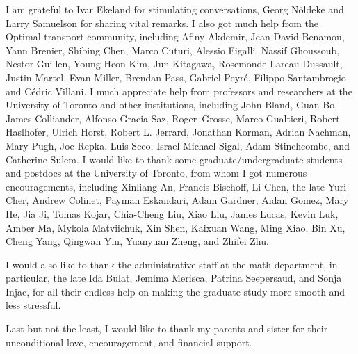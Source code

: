 \documentclass{ut-thesis}[10pt]
\theoremstyle{plain}
\theoremstyle{definition}
\theoremstyle{remark}
\numberwithin{equation}{section}
\begin{document}
\begin{preliminary}
\begin{acknowledgements}
I am grateful to Ivar Ekeland for stimulating conversations, Georg N\" oldeke and Larry Samuelson for sharing vital remarks.
I also got much help from the Optimal transport community, including  Afiny Akdemir, Jean-David Benamou, Yann Brenier, Shibing Chen, Marco Cuturi, Alessio Figalli, Nassif Ghoussoub, Nestor Guillen, Young-Heon Kim, Jun Kitagawa, Rosemonde Lareau-Dussault, Justin Martel, Evan Miller, Brendan Pass, Gabriel Peyré, Filippo Santambrogio and Cédric Villani. I much appreciate help from professors and researchers at the University of Toronto and other institutions, including John Bland, Guan Bo, James Colliander, Alfonso Gracia-Saz, Roger~Grosse, Marco Gualtieri, Robert Haslhofer, Ulrich Horst, Robert L. Jerrard, Jonathan Korman, Adrian Nachman, Mary Pugh, Joe Repka, Luis Seco,  Israel Michael Sigal, Adam Stinchcombe, and Catherine Sulem.
I would like to thank some graduate/undergraduate students and postdocs at the University of Toronto, from whom I got numerous encouragements, including Xinliang An,  Francis Bischoff, Li Chen, the late Yuri Cher,  Andrew Colinet, Payman Eskandari, Adam Gardner, Aidan Gomez, Mary He,  Jia Ji, Tomas Kojar, Chia-Cheng Liu, Xiao Liu,  James Lucas, Kevin Luk,  Amber Ma,  Mykola Matviichuk,  Xin Shen,  Kaixuan Wang,  Ming Xiao, Bin Xu,   Cheng Yang,  Qingwan Yin, Yuanyuan Zheng, and Zhifei Zhu.\medskip
 


I would also like to thank the administrative staff at the math department, in particular, the late Ida Bulat, Jemima Merisca, Patrina Seepersaud, and Sonja Injac, for all their endless help on making the graduate study more smooth and less stressful.  \medskip

Last but not the least, I would like to thank my parents and sister for their unconditional love, encouragement, and financial support.\medskip


\end{acknowledgements}

\tableofcontents




\end{preliminary}
\end{document}
